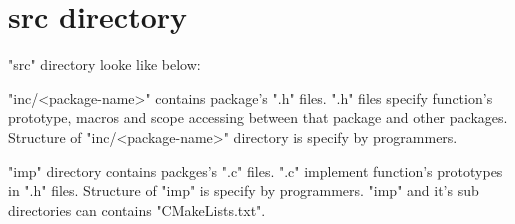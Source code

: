 \section{src directory}

\begin{crules}
\end{crules}

"src" directory looke like below:\\

"inc/<package-name>" contains package's ".h" files. ".h" files
specify function's prototype, macros and scope accessing between that
package and other packages. Structure of "inc/<package-name>"
directory is specify by programmers.

"imp" directory contains packges's ".c" files. ".c" implement function's
prototypes in ".h" files. Structure of "imp" is specify by programmers.
"imp" and it's sub directories can contains "CMakeLists.txt".

